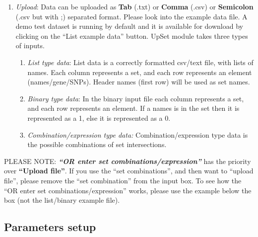 \documentclass[
  a4paper,
  DIV=11,
  numbers=noendperiod,
  oneside,
  open=any]{scrreport}
\providecommand{\tightlist}{%
  \setlength{\itemsep}{0pt}\setlength{\parskip}{0pt}}\usepackage{longtable,booktabs,array}
\begin{document}
\begin{enumerate}
\def\labelenumi{\arabic{enumi}.}
\item
  \emph{Upload}: Data can be uploaded as \textbf{Tab} (.txt) or
  \textbf{Comma} (.csv) or \textbf{Semicolon} (.csv but with ;)
  separated format. Please look into the example data file. A demo test
  dataset is running by default and it is available for download by
  clicking on the ``List example data'' button. UpSet module takes three
  types of inputs.

  \begin{enumerate}
  \def\labelenumii{\roman{enumii}.}
  \tightlist
  \item
    \emph{List type data}: List data is a correctly formatted csv/text
    file, with lists of names. Each column represents a set, and each
    row represents an element (names/gene/SNPs). Header names (first
    row) will be used as set names.
  \item
    \emph{Binary type data}: In the binary input file each column
    represents a set, and each row represents an element. If a names is
    in the set then it is represented as a 1, else it is represented as
    a 0.
  \item
    \emph{Combination/expression type data:} Combination/expression type
    data is the possible combinations of set intersections.
  \end{enumerate}
\end{enumerate}

\begin{tcolorbox}[enhanced jigsaw, breakable, colback=white, colbacktitle=quarto-callout-note-color!10!white, opacityback=0, left=2mm, bottomrule=.15mm, opacitybacktitle=0.6, coltitle=black, bottomtitle=1mm, toprule=.15mm, toptitle=1mm, arc=.35mm, titlerule=0mm, rightrule=.15mm, title=\textcolor{quarto-callout-note-color}{\faInfo}\hspace{0.5em}{Note}, colframe=quarto-callout-note-color-frame, leftrule=.75mm]

PLEASE NOTE: \textbf{\emph{``OR enter set combinations/expression''}}
has the priority over \textbf{``Upload file''}. If you use the ``set
combinations'', and then want to ``upload file'', please remove the
``set combination'' from the input box. To see how the ``OR enter set
combinations/expression'' works, please use the example below the box
(not the list/binary example file).

\end{tcolorbox}

\subsection{Parameters setup}\label{parameters-setup-4}
\end{document}
